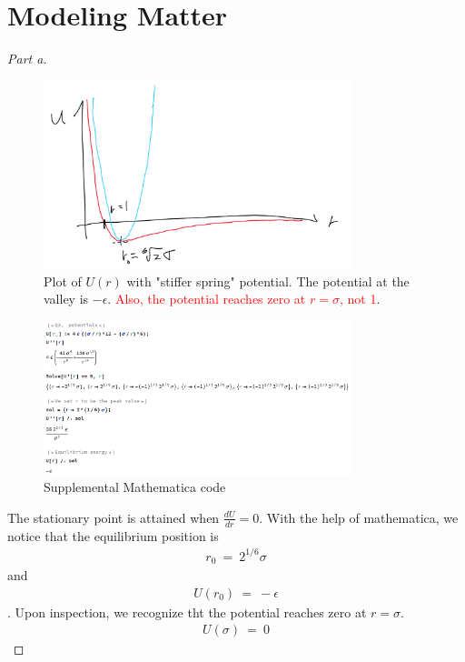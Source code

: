\documentclass{article}
\numberwithin{equation}{section}
\newcommand{\deriv}[2]{
\frac {d {#1} } {d {#2}}
}
\begin{document}
\section{Modeling Matter}
\begin{proof}[Part a]
    \begin{figure}[h]
        \centering
        \includegraphics[width=0.8\textwidth]{Q3_Potential.png} %
        \caption{Plot of $U(r)$ with "stiffer spring" potential. The potential 
        at the valley is $-\epsilon$. \textcolor{red}{Also, the potential reaches 
        zero at $r = \sigma$, not 1}. }
        \label{fig:q3plot}
    \end{figure}
    \begin{figure}[h]
        \centering
        \includegraphics[width=0.8\textwidth]{Q3_code.png} %
        \caption{Supplemental Mathematica code}
        \label{fig:q3code}
    \end{figure}
    
    The stationary point is attained when $\deriv{U}{r} = 0$. With the 
    help of mathematica, we notice that the equilibrium position is 
    \begin{align}
        r_0 \ = \ 2^{1/6} \sigma
    \end{align}
    and 
    \begin{align}
        U(r_0) \ = \ -\epsilon
    \end{align}.
    Upon inspection, we recognize tht the potential reaches zero at $r = \sigma$. 
    \begin{align}
        U(\sigma) \ = \ 0
    \end{align}
\end{proof}
\end{document}
